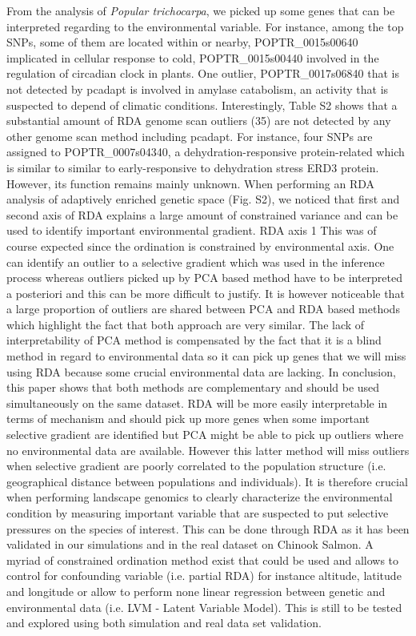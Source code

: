\documentclass[nogrid]{MBE}%
\begin{document}
From the analysis of \textit{Popular trichocarpa}, we picked up some genes that can be interpreted regarding to the environmental variable. For instance, among the top SNPs, some of them are located within or nearby, POPTR_0015s00640 implicated in cellular response to cold, POPTR_0015s00440 involved in the regulation of circadian clock in plants. One outlier, POPTR_0017s06840 that is not detected by pcadapt is involved in amylase catabolism, an activity that is suspected to depend of climatic conditions. Interestingly, Table S2 shows that a substantial amount of RDA genome scan outliers (35) are not detected by any other genome scan method including pcadapt. For instance, four SNPs are assigned to POPTR_0007s04340, a dehydration-responsive protein-related which is similar to similar to early-responsive to dehydration stress ERD3 protein. However, its function remains mainly unknown. 
When performing an RDA analysis of adaptively enriched genetic space (Fig. S2), we noticed that first and second axis of RDA explains a large amount of constrained variance and can be used to identify important environmental gradient. RDA axis 1 This was of course expected since the ordination is constrained by environmental axis. One can identify an outlier to a selective gradient which was used in the inference process whereas outliers picked up by PCA based method have to be interpreted a posteriori and this can be more difficult to justify. It is however noticeable that a large proportion of outliers are shared between PCA and RDA based methods which highlight the fact that both approach are very similar. The lack of interpretability of PCA method is compensated by the fact that it is a blind method in regard to environmental data so it can pick up genes that we will miss using RDA because some crucial environmental data are lacking. 
In conclusion, this paper shows that both methods are complementary and should be used simultaneously on the same dataset. RDA will be more easily interpretable in terms of mechanism and should pick up more genes when some important selective gradient are identified but PCA might be able to pick up outliers where no environmental data are available. However this latter method will miss outliers when selective gradient are poorly correlated to the population structure (i.e. geographical distance between populations and individuals). It is therefore crucial when performing landscape genomics to clearly characterize the environmental condition by measuring important variable that are suspected to put selective pressures on the species of interest. This can be done through RDA as it has been validated in our simulations and in the real dataset on Chinook Salmon. 
A myriad of constrained ordination method exist that could be used and allows to control for confounding variable (i.e. partial RDA) for instance altitude, latitude and longitude or allow to perform none linear regression between genetic and environmental data (i.e. LVM - Latent Variable Model). This is still to be tested and explored using both simulation and real data set validation.
\end{document}
